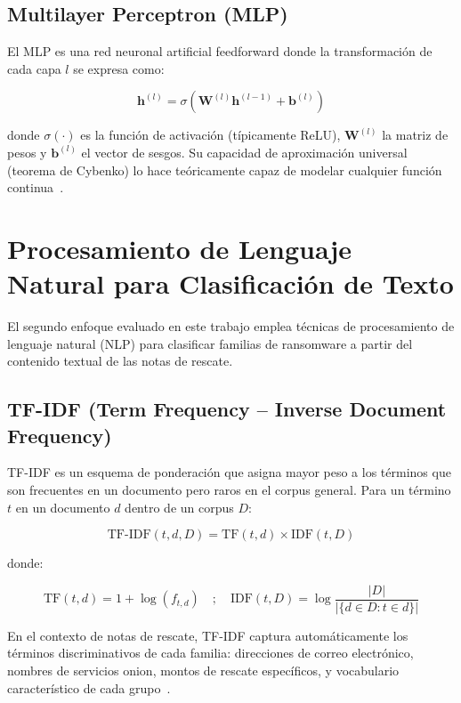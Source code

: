 \subsection{Multilayer Perceptron (MLP)}

El MLP es una red neuronal artificial feedforward donde la transformación de cada capa $l$ se expresa como:

\begin{equation}
    \mathbf{h}^{(l)} = \sigma(\mathbf{W}^{(l)}\mathbf{h}^{(l-1)} + \mathbf{b}^{(l)})
\end{equation}

donde $\sigma(\cdot)$ es la función de activación (típicamente ReLU), $\mathbf{W}^{(l)}$ la matriz de pesos y $\mathbf{b}^{(l)}$ el vector de sesgos. Su capacidad de aproximación universal (teorema de Cybenko) lo hace teóricamente capaz de modelar cualquier función continua~\cite{cybenko1989}.

\section{Procesamiento de Lenguaje Natural para Clasificación de Texto}

El segundo enfoque evaluado en este trabajo emplea técnicas de procesamiento de lenguaje natural (NLP) para clasificar familias de ransomware a partir del contenido textual de las notas de rescate.

\subsection{TF-IDF (Term Frequency -- Inverse Document Frequency)}

TF-IDF es un esquema de ponderación que asigna mayor peso a los términos que son frecuentes en un documento pero raros en el corpus general. Para un término $t$ en un documento $d$ dentro de un corpus $D$:

\begin{equation}
    \text{TF-IDF}(t, d, D) = \text{TF}(t, d) \times \text{IDF}(t, D)
\end{equation}

donde:

\begin{equation}
    \text{TF}(t, d) = 1 + \log(f_{t,d}) \quad ; \quad \text{IDF}(t, D) = \log\frac{|D|}{|\{d \in D : t \in d\}|}
\end{equation}

En el contexto de notas de rescate, TF-IDF captura automáticamente los términos discriminativos de cada familia: direcciones de correo electrónico, nombres de servicios onion, montos de rescate específicos, y vocabulario característico de cada grupo~\cite{paper_5_note_files}.

